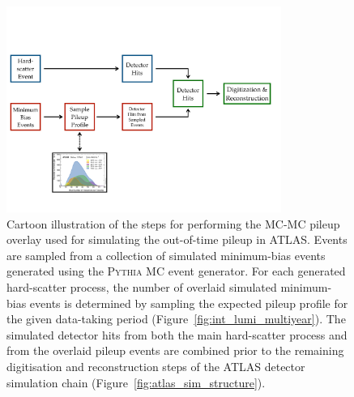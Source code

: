 \begin{figure}[!htb]
    \begin{center}
        \includegraphics[width=0.8\textwidth]{figures/event_simulation/pileup_illustrationPDF}
        \caption{
            Cartoon illustration of the steps for performing the MC-MC pileup overlay used
            for simulating the out-of-time pileup in ATLAS.
            Events are sampled from a collection of simulated minimum-bias events generated using the
            \textsc{Pythia} MC event generator.
            For each generated hard-scatter process, the number of overlaid simulated minimum-bias events is
            determined by sampling the expected pileup profile for the given data-taking period (Figure~\ref{fig:int_lumi_multiyear}).
            The simulated detector hits from both the main hard-scatter process and from
            the overlaid pileup events are combined prior to the remaining digitisation and reconstruction
            steps of the ATLAS detector simulation chain (Figure~\ref{fig:atlas_sim_structure}).
        }
        \label{fig:pileup_gen}
    \end{center}
\end{figure}

\FloatBarrier
